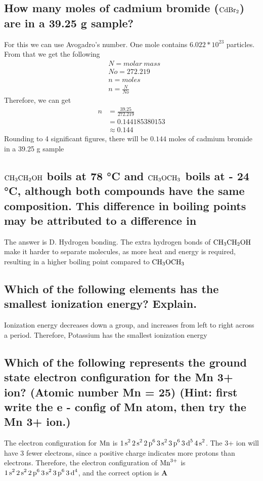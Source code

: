 \documentclass[11pt]{article}
\begin{document}
\subsection{How many moles of cadmium bromide (\(\ce{CdBr2}\)) are in a 39.25 g sample?}
\label{sec:org6c28a7b}
For this we can use Avogadro's number. One mole contains \(6.022*10^{23}\) particles. From that we get the following
\begin{align*}
&N = molar\ mass\\
&No = 272.219\\
&n = moles\\
&n=\frac{N}{No}
\end{align*}
Therefore, we can get
\begin{align*}
n&= \frac{39.25}{272.219}\\
&=0.144185380153\\
&\approx0.144
\end{align*}
Rounding to 4 significant figures, there will be \(0.144\) moles of cadmium bromide in a 39.25 g sample

\subsection{\(\ce{CH3CH2OH}\) boils at 78 °C and \(\ce{CH3OCH3}\) boils at - 24 °C, although both compounds have the same composition. This difference in boiling points may be attributed to a difference in}
\label{sec:org308aaff}
The answer is D. Hydrogen bonding. The extra hydrogen bonds of \(\ce{CH3CH2OH}\) make it harder to separate molecules, as more heat and energy is required, resulting in a higher boiling point compared to \(\ce{CH3OCH3}\)

\subsection{Which of the following elements has the smallest ionization energy? Explain.}
\label{sec:orgb400152}
Ionization energy decreases down a group, and increases from left to right across a period. Therefore, Potassium has the smallest ionization energy

\subsection{Which of the following represents the ground state electron configuration for the Mn 3+ ion? (Atomic number Mn = 25) (Hint: first write the e - config of Mn atom, then try the Mn 3+ ion.)}
\label{sec:org0b2c2cf}
The electron configuration for \(\ce{Mn}\) is \(\ce{1s^2 2s^2 2p^6 3s^2 3p^6 3d^5 4s^2}\). The 3+ ion will have 3 fewer electrons, since a positive charge indicates more protons than electrons. Therefore, the electron configuration of \(\ce{Mn^{3+}}\) is \(\ce{1s^2 2s^2 2p^6 3s^2 3p^6 3d^4}\), and the correct option is \textbf{A}
\end{document}
